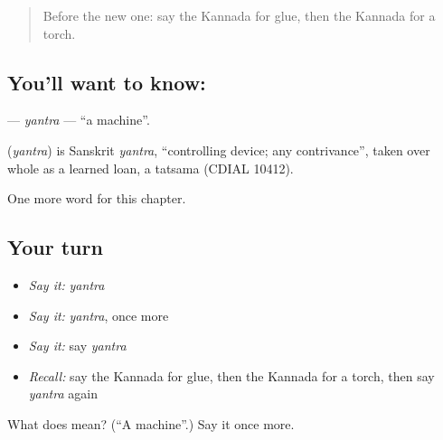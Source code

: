 \label{lesson:KA-C227-yantra}



\begin{quote}
Before the new one: say the Kannada for glue, then the Kannada for a torch.
\end{quote}

\subsection*{You'll want to know: }
\textbf{} — \emph{yantra} — \textquotedblleft{}a machine\textquotedblright{}.

\begin{cousinweb}
\textbf{} (\emph{yantra}) is Sanskrit \emph{yantra}, \textquotedblleft{}controlling device; any contrivance\textquotedblright{}, taken over whole as a learned loan, a tatsama (CDIAL 10412).
\end{cousinweb}

\begin{grammarlens}[title={What you've built}]
One more word for this chapter.
\end{grammarlens}

\subsection*{Your turn}
\begin{itemize}
\raggedright
  \item \emph{Say it:} \emph{yantra}
  \item \emph{Say it:} \emph{yantra}, once more
  \item \emph{Say it:} say \emph{yantra}
  \item \emph{Recall:} say the Kannada for glue, then the Kannada for a torch, then say \emph{yantra} again
\end{itemize}

\begin{tcolorbox}[breakable,colback=teal!4,colframe=teal!35!black,title={Before you move on}]
What does  mean? (\textquotedblleft{}A machine\textquotedblright{}.) Say it once more.
\end{tcolorbox}
